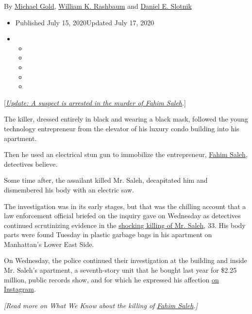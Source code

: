 By \href{https://www.nytimes.com/by/michael-gold}{Michael Gold},
\href{https://www.nytimes.com/by/william-k-rashbaum}{William K.
Rashbaum} and \href{https://www.nytimes.com/by/daniel-e-slotnik}{Daniel
E. Slotnik}

\begin{itemize}
\item
  Published July 15, 2020Updated July 17, 2020
\item
  \begin{itemize}
  \item
  \item
  \item
  \item
  \item
  \end{itemize}
\end{itemize}

{[}\href{https://www.nytimes.com/2020/07/17/nyregion/fahim-saleh-murder-arrest-tyrese-devon-haspil.html}{\emph{Update:
A suspect is arrested in the murder of Fahim Saleh}}.{]}

The killer, dressed entirely in black and wearing a black mask, followed
the young technology entrepreneur from the elevator of his luxury condo
building into his apartment.

Then he used an electrical stun gun to immobilize the entrepreneur,
\href{https://www.nytimes.com/2020/07/17/nyregion/fahim-saleh-killing-murder.html}{Fahim
Saleh}, detectives believe.

Some time after, the assailant killed Mr. Saleh, decapitated him and
dismembered his body with an electric saw.

The investigation was in its early stages, but that was the chilling
account that a law enforcement official briefed on the inquiry gave on
Wednesday as detectives continued scrutinizing evidence in the
\href{https://www.nytimes.com/2020/07/14/nyregion/dismembered-body-houston-street-manhattan.html?module=inline}{shocking
killing of Mr. Saleh}, 33. His body parts were found Tuesday in plastic
garbage bags in his apartment on Manhattan's Lower East Side.

On Wednesday, the police continued their investigation at the building
and inside Mr. Saleh's apartment, a seventh-story unit that he bought
last year for \$2.25 million, public records show, and for which he
expressed his affection
\href{https://www.instagram.com/p/B6KF3XglNbg/}{on Instagram}.

\emph{{[}Read more on What We Know about the killing of}
\href{https://www.nytimes.com/2020/07/17/nyregion/fahim-saleh-killing-murder.html}{\emph{Fahim
Saleh}}\emph{.{]}}

